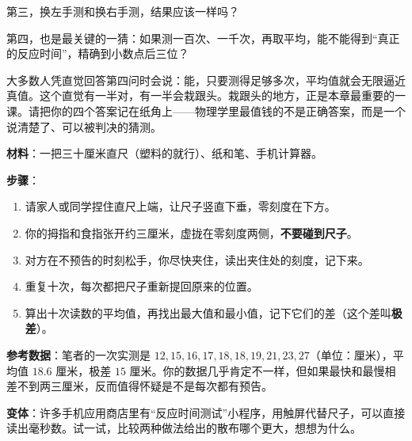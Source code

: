 第三，换左手测和换右手测，结果应该一样吗？

第四，也是最关键的一猜：如果测一百次、一千次，再取平均，能不能得到“真正的反应时间”，精确到小数点后三位？

大多数人凭直觉回答第四问时会说：能，只要测得足够多次，平均值就会无限逼近真值。这个直觉有一半对，有一半会栽跟头。栽跟头的地方，正是本章最重要的一课。请把你的四个答案记在纸角上——物理学里最值钱的不是正确答案，而是一个说清楚了、可以被判决的猜测。


\begin{experiment}[尺子反应时间]
\textbf{材料}：一把三十厘米直尺（塑料的就行）、纸和笔、手机计算器。

\textbf{步骤}：
\begin{enumerate}[leftmargin=2em]
  \item 请家人或同学捏住直尺上端，让尺子竖直下垂，零刻度在下方。
  \item 你的拇指和食指张开约三厘米，虚拢在零刻度两侧，\textbf{不要碰到尺子}。
  \item 对方在不预告的时刻松手，你尽快夹住，读出夹住处的刻度，记下来。
  \item 重复十次，每次都把尺子重新提回原来的位置。
  \item 算出十次读数的平均值，再找出最大值和最小值，记下它们的差（这个差叫\textbf{极差}）。
\end{enumerate}

\textbf{参考数据}：笔者的一次实测是 \(12, 15, 16, 17, 18, 18, 19, 21, 23, 27\)（单位：厘米），平均值 \(18.6\) 厘米，极差 \(15\) 厘米。你的数据几乎肯定不一样，但如果最快和最慢相差不到两三厘米，反而值得怀疑是不是每次都有预告。

\textbf{变体}：许多手机应用商店里有“反应时间测试”小程序，用触屏代替尺子，可以直接读出毫秒数。试一试，比较两种做法给出的散布哪个更大，想想为什么。
\end{experiment}

\begin{center}
\end{center}

